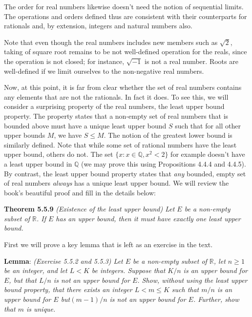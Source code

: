 \documentclass{article}
\newcommand{\real}{{\mathbb{R}}}
\begin{document}
The order for real numbers likewise doesn't need the notion of sequential limits. The operations and orders defined thus are consistent with their counterparts for rationals and, by extension, integers and natural numbers also. 

Note that even though the real numbers includes new members such as $\sqrt{2}$, taking of square root remains to be not well-defined operation for the reals, since the operation is not closed; for instance, $\sqrt{-1}$ is not a real number. Roots are well-defined if we limit ourselves to the non-negative real numbers.

Now, at this point, it is far from clear whether the set of real numbers contains any elements that are not the rationals. In fact it does. To see this, we will consider a surprising property of the real numbers, the least upper bound property. The property states that a non-empty set of real numbers that is bounded above must have a unique least upper bound $S$ such that for all other upper bounds $M$, we have $S \leq M$. The notion of the greatest lower bound is similarly defined. Note that while some set of rational numbers have the least upper bound, others do not. The set $\{ x : x \in \mathbb{Q}, x^2 < 2 \}$ for example doesn't have a least upper bound in $\mathbb{Q}$ (we may prove this using Propositions 4.4.4 and 4.4.5). By contrast, the least upper bound property states that \textit{any} bounded, empty set of real numbers \textit{always} has a unique least upper bound. We will review the book's beautiful proof and fill in the details below:

\textbf{Theorem 5.5.9} \textit{(Existence of the least upper bound) Let $E$ be a non-empty subset of $\real$. If $E$ has an upper bound, then it must have exactly one least upper bound.}

First we will prove a key lemma that is left as an exercise in the text.

\textbf{Lemma}: \textit{(Exercise 5.5.2 and 5.5.3) Let $E$ be a non-empty subset of $\real$, let $n \geq 1$ be an integer, and let $L < K$ be integers. Suppose that $K/n$ is an upper bound for $E$, but that $L/n$ is not an upper bound for $E$. Show, without using the least upper bound property, that there exists an integer $L < m \leq K$ such that $m/n$ is an upper bound for $E$ but$(m-1)/n$ is not an upper bound for $E$. Further, show that $m$ is unique.}
\end{document}
